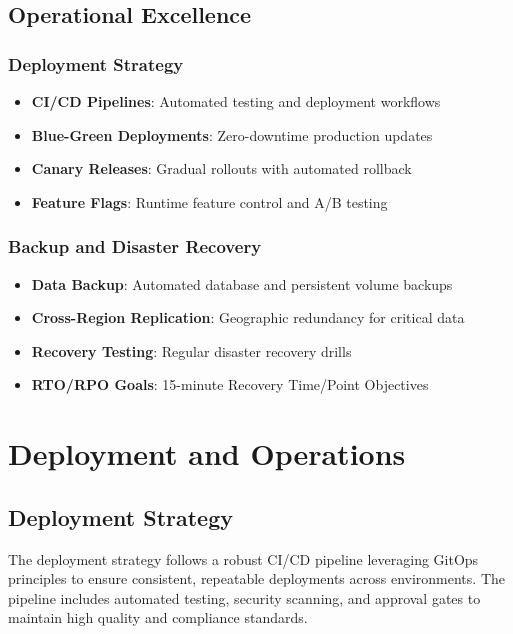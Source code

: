 \documentclass[12pt]{report}
\begin{document}
\section{Operational Excellence}

\subsection{Deployment Strategy}
\begin{itemize}
  \item \textbf{CI/CD Pipelines}: Automated testing and deployment workflows
  \item \textbf{Blue-Green Deployments}: Zero-downtime production updates
  \item \textbf{Canary Releases}: Gradual rollouts with automated rollback
  \item \textbf{Feature Flags}: Runtime feature control and A/B testing
\end{itemize}

\subsection{Backup and Disaster Recovery}
\begin{itemize}
  \item \textbf{Data Backup}: Automated database and persistent volume backups
  \item \textbf{Cross-Region Replication}: Geographic redundancy for critical data
  \item \textbf{Recovery Testing}: Regular disaster recovery drills
  \item \textbf{RTO/RPO Goals}: 15-minute Recovery Time/Point Objectives
\end{itemize}

\chapter{Deployment and Operations}
\section{Deployment Strategy}
The deployment strategy follows a robust CI/CD pipeline leveraging GitOps principles to ensure consistent, repeatable deployments across environments. The pipeline includes automated testing, security scanning, and approval gates to maintain high quality and compliance standards.
\end{document}
